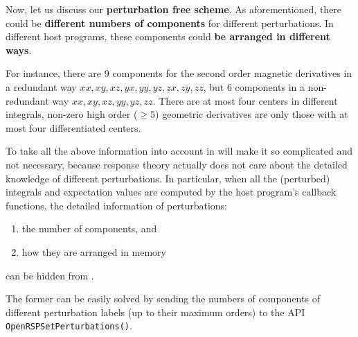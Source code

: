 Now, let us discuss our \textbf{perturbation free scheme}. As aforementioned,
there could be \textbf{different numbers of components} for different
perturbations. In different host programs, these components could \textbf{be
arranged in different ways}.

For instance, there are 9 components for the second order magnetic derivatives
in a redundant way $xx,xy,xz,yx,yy,yz,zx,zy,zz$, but 6 components in a
non-redundant way $xx,xy,xz,yy,yz,zz$. There are at most four centers in
different integrals, non-zero high order ($\ge 5$) geometric derivatives are
only those with at most four differentiated centers.

To take all the above information into account in \LibName will make it so
complicated and not necessary, because response theory actually does not care
about the detailed knowledge of different perturbations. In particular, when
all the (perturbed) integrals and expectation values are computed by the host
program's callback functions, the detailed information of perturbations:
\begin{enumerate}
  \item the number of components, and
  \item how they are arranged in memory
\end{enumerate}
can be hidden from \LibName.

The former can be easily solved by sending the numbers of components of
different perturbation labels (up to their maximum orders) to the \LibName API
\texttt{OpenRSPSetPerturbations()}.

